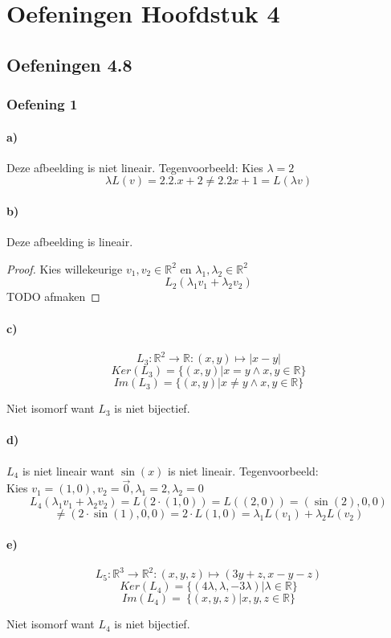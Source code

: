 \documentclass[lineaire_algebra_oplossingen.tex]{subfiles}
\begin{document}
\chapter{Oefeningen Hoofdstuk 4}
\section{Oefeningen 4.8}
\subsection{Oefening 1}
\subsubsection*{a)}
Deze afbeelding is niet lineair. Tegenvoorbeeld: Kies $\lambda = 2$\\
\[
\lambda L(v) = 2 . 2 . x + 2 \neq 2 . 2 x + 1 = L(\lambda v)
\]

\subsubsection*{b)}
Deze afbeelding is lineair.
\begin{proof}
Kies willekeurige $v_1, v_2 \in \mathbb{R}^2$ en $\lambda_1, \lambda_2 \in \mathbb{R}^2$
\[
L_2(\lambda_1v_1 + \lambda_2v_2)
\]
TODO afmaken
\end{proof}

\subsubsection*{c)}
$$
L_3:\mathbb{R}^2\rightarrow\mathbb{R}:(x,y)\mapsto |x-y|
$$
$$
Ker(L_3)= \{(x,y)|x=y \wedge x,y \in \mathbb{R} \}
$$
$$
Im(L_3)= \{(x,y)|x\neq y \wedge x,y \in \mathbb{R} \}
$$
\begin{center}
Niet isomorf want $L_3$ is niet bijectief.
\end{center}

\subsubsection*{d)}
$L_4$ is niet lineair want $\sin(x)$ is niet lineair.
Tegenvoorbeeld:\\
Kies $v_1=(1,0),v_2=\vec{0},\lambda_1 = 2,\lambda_2=0$
\[
L_4(\lambda_1v_1+\lambda_2v_2) = L(2\cdot(1,0))= L((2,0))=(\sin(2),0,0)
\]
\[
\neq (2\cdot \sin(1),0,0) = 2\cdot L(1,0) = \lambda_1L(v_1)+\lambda_2L(v_2)
\]

\subsubsection*{e)}
$$
L_5:\mathbb{R}^3\rightarrow\mathbb{R}^2:(x,y,z)\mapsto (3y+z,x-y-z)
$$
$$
Ker(L_4)= \{(4\lambda ,\lambda ,-3\lambda)|\lambda \in \mathbb{R} \}
$$
$$
Im(L_4)= \ \{(x ,y ,z)|x,y,z \in \mathbb{R} \}
$$
\begin{center}
Niet isomorf want $L_4$ is niet bijectief.
\end{center}
\end{document}
